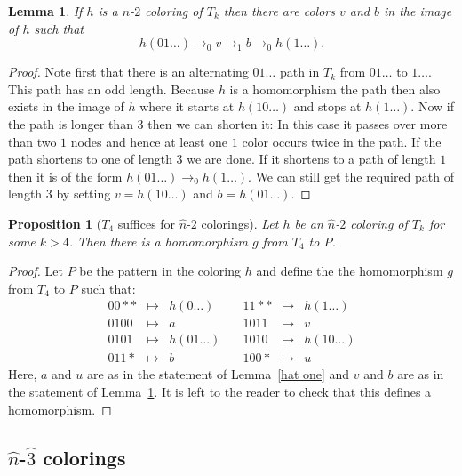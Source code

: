\documentclass[a4paper]{article}
\newcommand{\any}{{*}}
\newtheorem{lemma}[theorem]{Lemma}
\newtheorem{proposition}[theorem]{Proposition}
\begin{document}
\begin{lemma} \label{hat two}
 If $h$ is a $n$-$2$ coloring of $T_k$ then there are colors $v$
and $b$ in the image of $h$ such that
\[
 h(01\dots) \rightarrow_0 v \rightarrow_1 b \rightarrow_0 h(1\dots).
\]
\end{lemma}
\begin{proof}
 Note first that there is an alternating $01 \dots$ path in $T_k$ from
$01\dots$ to $1 \dots$. This path has an odd length. Because $h$ is a
homomorphism the path then also exists in the image of $h$ where it
starts at $h(10\dots)$ and stops at $h(1\dots)$. Now if the path is
longer than $3$ then we can shorten it: In this case it passes over more
than two $1$ nodes and hence at least one $1$ color occurs twice in the
path. If the path shortens to one of length $3$ we are done. If it
shortens to a path of length $1$ then it is of the form $h(01\dots)
\rightarrow_0 h(1\dots)$. We can still get the required path of length
$3$ by setting $v = h(10\dots)$ and $b = h(01\dots)$.
\end{proof}

\begin{proposition}[$T_4$ suffices for $\hat{n}$-$2$ colorings]
 Let $h$ be an $\hat{n}$-$2$ coloring of $T_k$ for some $k > 4$. Then
there is a homomorphism $g$ from $T_4$ to $P$.
\end{proposition}
\begin{proof}
Let $P$ be the pattern in the coloring $h$ and define the the
homomorphism $g$ from $T_4$ to $P$ such that:
\[
 \begin{array}{rcl}
 00\any\any & \mapsto & h(0\dots) \\
 0100 & \mapsto & a \\
 0101 & \mapsto & h(01\dots) \\
 011\any & \mapsto & b
 \end{array} \quad
 \begin{array}{rcl}
 11\any\any & \mapsto & h(1\dots) \\
 1011 & \mapsto & v \\
 1010 & \mapsto & h(10\dots) \\
 100\any & \mapsto & u
 \end{array}
\]
Here, $a$ and $u$ are as in the statement of Lemma~\ref{hat one} and $v$
and $b$ are as in the statement of Lemma~\ref{hat two}. It is left to
the reader to check that this defines a homomorphism.
\end{proof}


\subsection{$\hat{n}$-$\hat{3}$ colorings}
\end{document}
